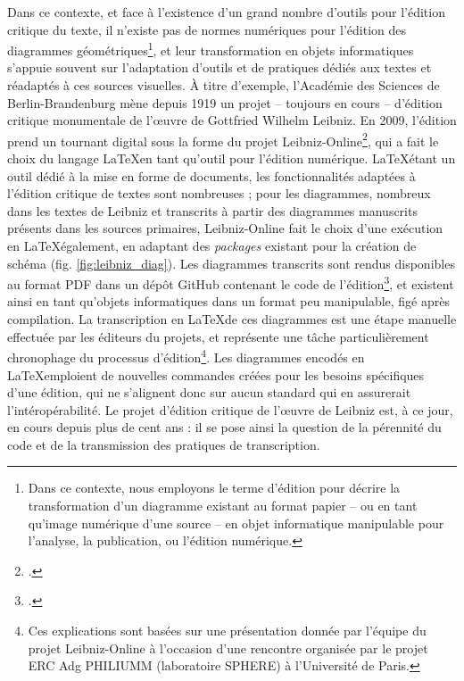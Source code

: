 		Dans ce contexte, et face à l'existence d'un grand nombre d'outils pour l'édition critique du texte, il n'existe pas de normes numériques pour l'édition des diagrammes géométriques\footnote{Dans ce contexte, nous employons le terme d'édition pour décrire la transformation d'un diagramme existant au format papier -- ou en tant qu'image numérique d'une source -- en objet informatique manipulable pour l'analyse, la publication, ou l'édition numérique.}, et leur transformation en objets informatiques s'appuie souvent sur l'adaptation d'outils et de pratiques dédiés aux textes et réadaptés à ces sources visuelles. À titre d'exemple, l'Académie des Sciences de Berlin-Brandenburg mène depuis 1919 un projet -- toujours en cours -- d'édition critique monumentale de l'œuvre de Gottfried Wilhelm Leibniz. En 2009, l'édition prend un tournant digital sous la forme du projet Leibniz-Online\footcite{LeibnizOnlineLeibnizEditionc}, qui a fait le choix du langage \LaTeX en tant qu'outil pour l'édition numérique. \LaTeX étant un outil dédié à la mise en forme de documents, les fonctionnalités adaptées à l'édition critique de textes sont nombreuses ; pour les diagrammes, nombreux dans les textes de Leibniz et transcrits à partir des diagrammes manuscrits présents dans les sources primaires, Leibniz-Online fait le choix d'une exécution en \LaTeX également, en adaptant des \textit{packages} existant pour la création de schéma (fig. \ref{fig:leibniz_diag}). Les diagrammes transcrits sont rendus disponibles au format PDF dans un dépôt GitHub contenant le code de l'édition\footcite{LeibnizVIIILaTeX_TEIa}, et existent ainsi en tant qu'objets informatiques dans un format peu manipulable, figé après compilation. La transcription en \LaTeX de ces diagrammes est une étape manuelle effectuée par les éditeurs du projets, et représente une tâche particulièrement chronophage du processus d'édition\footnote{Ces explications sont basées sur une présentation donnée par l'équipe du projet Leibniz-Online à l'occasion d'une rencontre organisée par le projet ERC Adg PHILIUMM (laboratoire SPHERE) à l'Université de Paris.}. Les diagrammes encodés en \LaTeX emploient de nouvelles commandes créées pour les besoins spécifiques d'une édition, qui ne s'alignent donc sur aucun standard qui en assurerait l'intéropérabilité. Le projet d'édition critique de l'œuvre de Leibniz est, à ce jour, en cours depuis plus de cent ans : il se pose ainsi la question de la pérennité du code et de la transmission des pratiques de transcription. 
		
